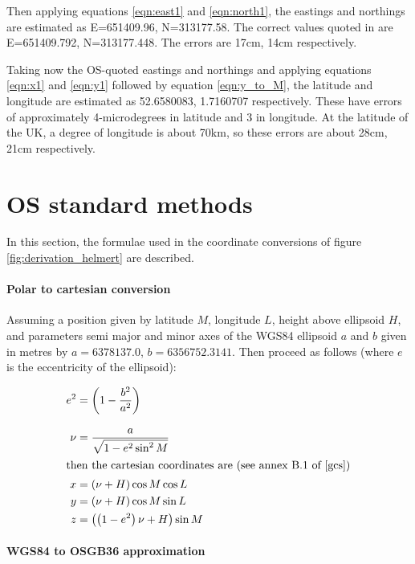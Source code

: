 \documentclass[10pt,a4paper]{article}
\begin{document}
Then applying equations \eqref{eqn:east1} and \eqref{eqn:north1}, the eastings
and northings are estimated as E=651409.96, N=313177.58.  The correct values
quoted in \cite{toug} are E=651409.792, N=313177.448.  The errors are 17cm,
14cm respectively.

Taking now the OS-quoted eastings and northings and applying equations
\eqref{eqn:x1} and \eqref{eqn:y1} followed by equation \eqref{eqn:y_to_M}, the
latitude and longitude are estimated as 52.6580083,  1.7160707
respectively.  These have errors of approximately 4-microdegrees in latitude and
3 in longitude.  At the latitude of the UK, a degree of longitude is about
70km, so these errors are about 28cm, 21cm respectively.

\section {OS standard methods}
\label{sec:os_models}

In this section, the formulae used in the coordinate conversions of figure
\ref{fig:derivation_helmert} are described.

\paragraph{Polar to cartesian conversion}
\label{sec:polar_to_cart}
Assuming a position given by latitude $M$, longitude $L$, height above
ellipsoid $H$, and parameters semi major and minor axes of the WGS84 ellipsoid
$a$ and $b$ given in metres by $a = 6378137.0$, $b = 6356752.3141$.  Then proceed as follows (where $e$ is the eccentricity of the ellipsoid):

\begin{align}
  e^2 & = \left(1 - \dfrac{b^2}{a^2}\right) \\[2ex]
  \nu & = \frac{a}{\sqrt{1 - e^2 \sin^2{M}}} \\
  \intertext{then the cartesian coordinates are (see annex B.1 of \cite{gcs})}
x & = (\nu + H) \cos{M} \cos{L}
\label{eqn:ptoc_x} \\
y & = (\nu + H) \cos{M} \sin{L} \\
z & = \left(\left(1 - e^2\right)\nu + H\right)\sin{M}
\label{eqn:ptoc_z}
\end{align}

\paragraph{WGS84 to OSGB36 approximation}
\end{document}
